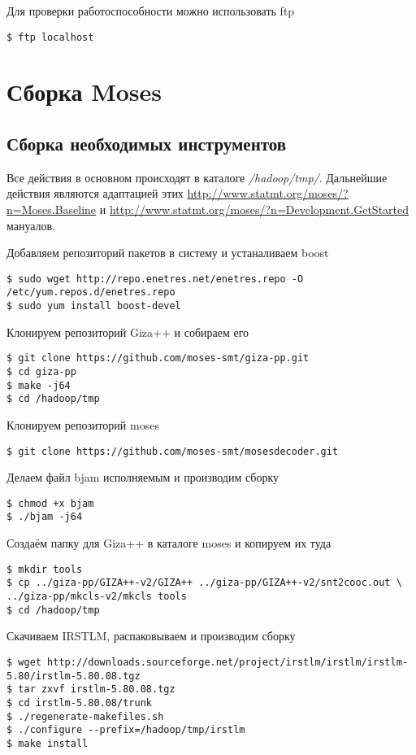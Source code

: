 Для проверки работоспособности можно использовать ftp
\begin{lstlisting}
$ ftp localhost
\end{lstlisting}

\section{Сборка Moses}
\subsection{Сборка необходимых инструментов}
Все действия в основном происходят в каталоге \emph{/hadoop/tmp/}. Дальнейшие действия являются 
адаптацией этих \url{http://www.statmt.org/moses/?n=Moses.Baseline} и 
\url{http://www.statmt.org/moses/?n=Development.GetStarted} мануалов.

Добавляем репозиторий пакетов в систему и устаналиваем boost
\begin{lstlisting}
$ sudo wget http://repo.enetres.net/enetres.repo -O /etc/yum.repos.d/enetres.repo
$ sudo yum install boost-devel
\end{lstlisting}

Клонируем репозиторий Giza++ и собираем его
\begin{lstlisting}
$ git clone https://github.com/moses-smt/giza-pp.git
$ cd giza-pp
$ make -j64
$ cd /hadoop/tmp
\end{lstlisting}

Клонируем репозиторий moses
\begin{lstlisting}
$ git clone https://github.com/moses-smt/mosesdecoder.git
\end{lstlisting}
Делаем файл bjam исполняемым и производим сборку
\begin{lstlisting}
$ chmod +x bjam
$ ./bjam -j64
\end{lstlisting}

Создаём папку для Giza++ в каталоге moses и копируем их туда
\begin{lstlisting}
$ mkdir tools
$ cp ../giza-pp/GIZA++-v2/GIZA++ ../giza-pp/GIZA++-v2/snt2cooc.out \
../giza-pp/mkcls-v2/mkcls tools
$ cd /hadoop/tmp
\end{lstlisting}

Скачиваем IRSTLM, распаковываем и производим сборку
\begin{lstlisting}
$ wget http://downloads.sourceforge.net/project/irstlm/irstlm/irstlm-5.80/irstlm-5.80.08.tgz
$ tar zxvf irstlm-5.80.08.tgz
$ cd irstlm-5.80.08/trunk
$ ./regenerate-makefiles.sh
$ ./configure --prefix=/hadoop/tmp/irstlm
$ make install
\end{lstlisting}

